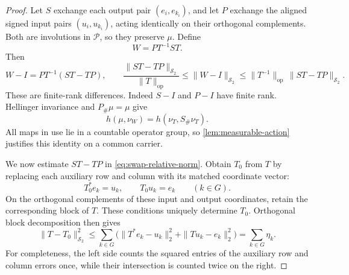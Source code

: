 \begin{proof}
Let $S$ exchange each output pair $(e_i,e_{k_i})$, and let $P$ exchange
the aligned signed input pairs $(u_i,u_{k_i})$, acting identically on
their orthogonal complements.  Both are involutions in
$\mathcal P$, so they preserve $\mu$.  Define
\[
 W=P T^{-1} S T.
\]
Then
\begin{equation}
 W-I=P T^{-1}(ST-TP),\qquad
 \frac{\|ST-TP\|_{\mathcal S_2}}{\|T\|_{\mathrm{op}}}
 \leq\|W-I\|_{\mathcal S_2}
 \leq\|T^{-1}\|_{\mathrm{op}}\,\|ST-TP\|_{\mathcal S_2}.
 \label{eq:swap-relative-norm}
\end{equation}
These are finite-rank differences.
Indeed $S-I$ and $P-I$ have finite rank.
Hellinger invariance and $P_\#\mu=\mu$ give
\begin{equation}
 h(\mu,\nu_W)=h(\nu_T,S_\#\nu_T).
 \label{eq:swap-hellinger-identity}
\end{equation}
All maps in use lie in a countable operator group, so
\cref{lem:measurable-action} justifies this identity on a common
carrier.

We now estimate $ST-TP$ in \eqref{eq:swap-relative-norm}.
Obtain $T_0$ from $T$ by replacing each auxiliary row and column with
its matched coordinate vector:
\[
 T_0^*e_k=u_k,\qquad T_0u_k=e_k\qquad(k\in G).
\]
On the orthogonal complements of these input and output coordinates,
retain the corresponding block of $T$.  These conditions uniquely
determine $T_0$.
Orthogonal block decomposition then gives
\begin{equation}
 \|T-T_0\|_{\mathcal S_2}^2
 \leq\sum_{k\in G}
       \bigl(\|T^*e_k-u_k\|_2^2+\|Tu_k-e_k\|_2^2\bigr)
 =\sum_{k\in G}\eta_k.
 \label{eq:auxiliary-coordinate-approximation}
\end{equation}
For completeness, the left side counts the squared entries of the
auxiliary row and column errors once, while their intersection is
counted twice on the right.


\end{proof}
